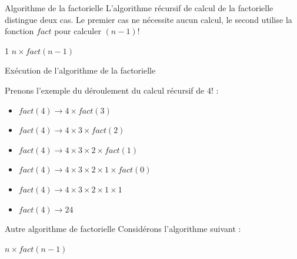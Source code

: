 \documentclass[10pt,xcolor=dvipsnames]{beamer}
\begin{document}
\begin{frame}{Algorithme de la factorielle}
L'algorithme récursif de calcul de la factorielle distingue deux cas. Le premier cas ne nécessite aucun calcul, le second utilise la fonction $fact$ pour calculer $(n-1)!$

\begin{tcolorbox}
  \begin{algorithmic}[1]
        \State{} 1
      \Else
        \State{} $n \times fact(n-1)$
      \EndIf
    \EndFunction
  \end{algorithmic}
\end{tcolorbox}

\end{frame}

\begin{frame}{Exécution de l'algorithme de la factorielle}

Prenons l'exemple du déroulement du calcul récursif de $4!$ :
\begin{center}
    \begin{itemize}[<+->]
\item[] $fact(4) \rightarrow 4 \times fact(3)$
\item[] $fact(4) \rightarrow 4 \times 3 \times fact(2)$
\item[] $fact(4) \rightarrow 4 \times 3 \times 2 \times fact(1)$
\item[] $fact(4) \rightarrow 4 \times 3 \times 2 \times 1 \times fact(0)$
\item[] $fact(4) \rightarrow 4 \times 3 \times 2 \times 1 \times 1$
\item[] $fact(4) \rightarrow 24$
\end{itemize}
\end{center}
\end{frame}

\begin{frame}{Autre algorithme de factorielle}
    Considérons l'algorithme suivant :
    
    \begin{tcolorbox}
  \begin{algorithmic}[1]
        \State{} $n \times fact(n-1)$
    \EndFunction
  \end{algorithmic}
\end{tcolorbox}


\end{frame}
\end{document}
